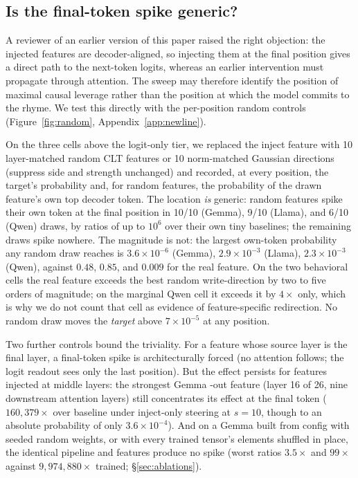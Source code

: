 \documentclass[11pt]{article}
\begin{document}
\subsection{Is the final-token spike generic?}
\label{sec:generic}

A reviewer of an earlier version of this paper raised the right objection: the injected features are decoder-aligned, so injecting them at the final position gives a direct path to the next-token logits, whereas an earlier intervention must propagate through attention. The sweep may therefore identify the position of maximal causal leverage rather than the position at which the model commits to the rhyme. We test this directly with the per-position random controls (Figure~\ref{fig:random}, Appendix~\ref{app:newline}).

On the three cells above the logit-only tier, we replaced the inject feature with 10 layer-matched random CLT features or 10 norm-matched Gaussian directions (suppress side and strength unchanged) and recorded, at every position, the target's probability and, for random features, the probability of the drawn feature's own top decoder token. The location \emph{is} generic: random features spike their own token at the final position in 10/10 (Gemma), 9/10 (Llama), and 6/10 (Qwen) draws, by ratios of up to $10^{6}$ over their own tiny baselines; the remaining draws spike nowhere. The magnitude is not: the largest own-token probability any random draw reaches is $3.6\times10^{-6}$ (Gemma), $2.9\times10^{-3}$ (Llama), $2.3\times10^{-3}$ (Qwen), against $0.48$, $0.85$, and $0.009$ for the real feature. On the two behavioral cells the real feature exceeds the best random write-direction by two to five orders of magnitude; on the marginal Qwen cell it exceeds it by $4\times$ only, which is why we do not count that cell as evidence of feature-specific redirection. No random draw moves the \emph{target} above $7\times10^{-5}$ at any position.

Two further controls bound the triviality. For a feature whose source layer is the final layer, a final-token spike is architecturally forced (no attention follows; the logit readout sees only the last position). But the effect persists for features injected at middle layers: the strongest Gemma -out feature (layer 16 of 26, nine downstream attention layers) still concentrates its effect at the final token ($160{,}379\times$ over baseline under inject-only steering at $s{=}10$, though to an absolute probability of only $3.6\times10^{-4}$). And on a Gemma built from config with seeded random weights, or with every trained tensor's elements shuffled in place, the identical pipeline and features produce no spike (worst ratios $3.5\times$ and $99\times$ against $9{,}974{,}880\times$ trained; \S\ref{sec:ablations}).
\end{document}
